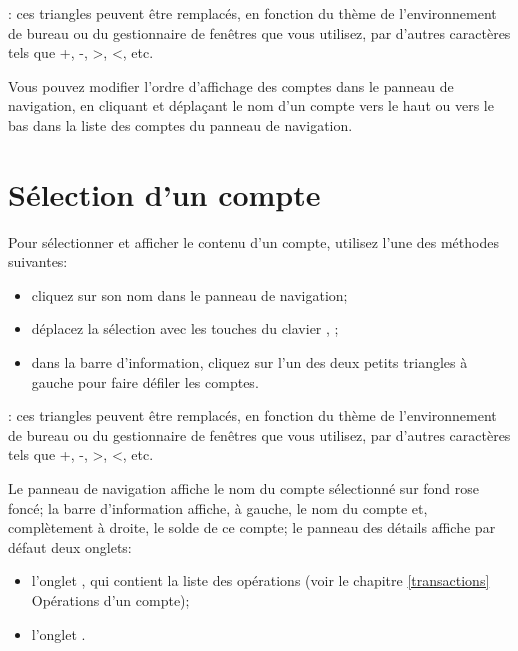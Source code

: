 \Note{}: ces triangles peuvent être remplacés, en fonction du thème de l'environnement de bureau ou du gestionnaire de fenêtres que vous utilisez, par d'autres caractères tels que +, -, >, <, etc.


Vous pouvez modifier l'ordre d'affichage des comptes dans le panneau de navigation, en cliquant et déplaçant le nom d'un compte vers le haut ou vers le bas dans la liste des comptes du panneau de navigation.


\section{Sélection d'un compte\label{accounts-selection}}


Pour sélectionner et afficher le contenu d'un compte, utilisez l'une des méthodes suivantes:

\begin{itemize}
	 \item cliquez sur son nom dans le panneau de navigation;
	 \item déplacez la sélection avec les touches du clavier \keys{\arrowkeyup}, \keys{\arrowkeydown};
	 \item dans la barre d'information, cliquez sur l'un des deux petits triangles à gauche pour faire défiler les comptes.
\end{itemize}

\Note{}: ces triangles peuvent être remplacés, en fonction du thème de l'environnement de bureau ou du gestionnaire de fenêtres que vous utilisez, par d'autres caractères tels que +, -, >, <, etc.

Le panneau de navigation affiche le nom du compte sélectionné sur {\setlength{\fboxsep}{2pt}\colorbox[RGB]{235,149,149}{fond rose foncé}}; la barre d'information affiche, à gauche, le nom du compte et, complètement à droite, le solde de ce compte; le panneau des détails affiche par défaut deux onglets:
\begin{itemize}
	 \item l'onglet , qui contient la liste des opérations (voir le chapitre \vref{transactions} Opérations d'un compte);
	 \item l'onglet .
\end{itemize}

